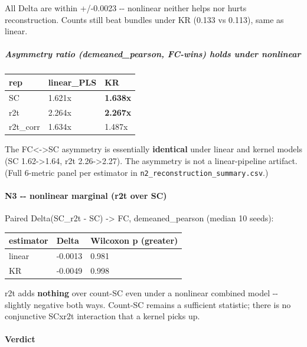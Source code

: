 All Delta are within +/-0.0023 -\/- nonlinear neither helps nor hurts reconstruction. Counts still beat bundles under KR (0.133 vs 0.113), same as linear.

\subparagraph{Asymmetry ratio (demeaned\_pearson, FC-wins) holds under nonlinear}\label{asymmetry-ratio-demeaned_pearson-fc-wins-holds-under-nonlinear}

{\def\LTcaptype{none} %
\begin{longtable}[]{@{}lll@{}}
\toprule\noalign{}
rep & linear\_PLS & KR \\
\midrule\noalign{}
\endhead
\bottomrule\noalign{}
\endlastfoot
SC & 1.621x & \textbf{1.638x} \\
r2t & 2.264x & \textbf{2.267x} \\
r2t\_corr & 1.634x & 1.487x \\
\end{longtable}
}

The FC\textless-\textgreater SC asymmetry is essentially \textbf{identical} under linear and kernel models (SC 1.62-\textgreater1.64, r2t 2.26-\textgreater2.27). The asymmetry is not a linear-pipeline artifact. (Full 6-metric panel per estimator in \texttt{n2\_reconstruction\_summary.csv}.)

\paragraph{N3 -\/- nonlinear marginal (r2t over SC)}\label{n3----nonlinear-marginal-r2t-over-sc}

Paired Delta(SC\_r2t - SC) -\textgreater{} FC, demeaned\_pearson (median 10 seeds):

{\def\LTcaptype{none} %
\begin{longtable}[]{@{}lll@{}}
\toprule\noalign{}
estimator & Delta & Wilcoxon p (greater) \\
\midrule\noalign{}
\endhead
\bottomrule\noalign{}
\endlastfoot
linear & -0.0013 & 0.981 \\
KR & -0.0049 & 0.998 \\
\end{longtable}
}

r2t adds \textbf{nothing} over count-SC even under a nonlinear combined model -\/- slightly negative both ways. Count-SC remains a sufficient statistic; there is no conjunctive SCxr2t interaction that a kernel picks up.

\paragraph{Verdict}\label{verdict}

